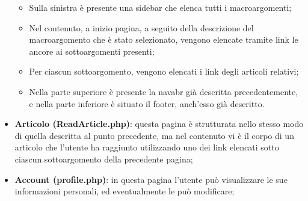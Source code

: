\documentclass[12pt]{article}
\begin{document}
\begin{itemize}
				\begin{itemize}
					\item Sulla sinistra è presente una sidebar che elenca tutti i macroargomenti;
					\item Nel contenuto, a inizio pagina, a seguito della descrizione del macroargomento che è stato selezionato, vengono elencate tramite link le ancore ai sottoargomenti presenti;
					\item Per ciascun sottoargomento, vengono elencati i link degli articoli relativi;
					\item Nella parte superiore è presente la navabr già descritta precedentemente, e nella parte inferiore è situato il footer, anch'esso già descritto.
				\end{itemize}
			\item \textbf{Articolo (ReadArticle.php)}: questa pagina è strutturata nello stesso modo di quella descritta al punto precedente, ma nel contenuto vi è il corpo di un articolo che l'utente ha raggiunto utilizzando uno dei link elencati sotto ciascun sottoargomento della precedente pagina;
			\item \textbf{Account (profile.php)}: in questa pagina l'utente può visualizzare le sue informazioni personali, ed eventualmente le può modificare;
		\end{itemize}
	
\end{document}
